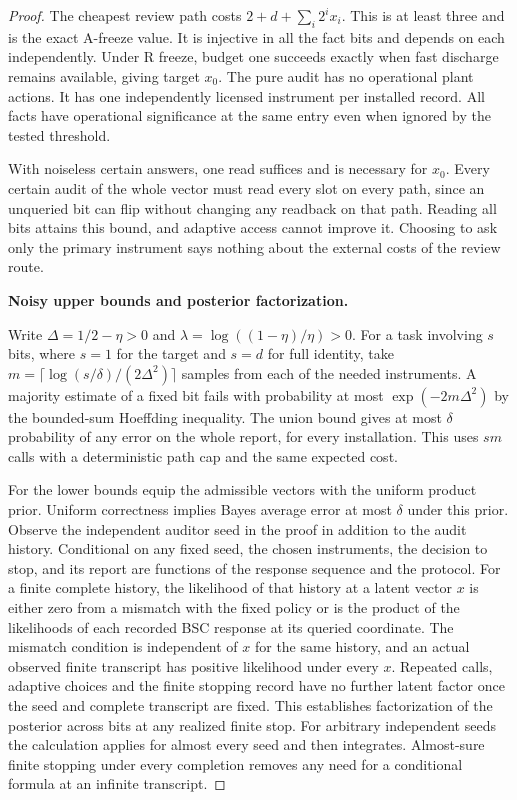 \begin{proof}
The cheapest review path costs \(2+d+\sum_i2^i x_i\). This is at least three and is the exact A-freeze value. It is injective in all the fact bits and depends on each independently. Under R freeze, budget one succeeds exactly when fast discharge remains available, giving target \(x_0\). The pure audit has no operational plant actions. It has one independently licensed instrument per installed record. All facts have operational significance at the same entry even when ignored by the tested threshold.

With noiseless certain answers, one read suffices and is necessary for \(x_0\). Every certain audit of the whole vector must read every slot on every path, since an unqueried bit can flip without changing any readback on that path. Reading all bits attains this bound, and adaptive access cannot improve it. Choosing to ask only the primary instrument says nothing about the external costs of the review route.

\textbf{Noisy upper bounds and posterior factorization.}

Write \(\Delta=1/2-\eta>0\) and \(\lambda=\log((1-\eta)/\eta)>0\). For a task involving \(s\) bits, where \(s=1\) for the target and \(s=d\) for full identity, take \(m=\lceil\log(s/\delta)/(2\Delta^2)\rceil\) samples from each of the needed instruments. A majority estimate of a fixed bit fails with probability at most \(\exp(-2m\Delta^2)\) by the bounded-sum Hoeffding inequality. The union bound gives at most \(\delta\) probability of any error on the whole report, for every installation. This uses \(sm\) calls with a deterministic path cap and the same expected cost.

For the lower bounds equip the admissible vectors with the uniform product prior. Uniform correctness implies Bayes average error at most \(\delta\) under this prior. Observe the independent auditor seed in the proof in addition to the audit history. Conditional on any fixed seed, the chosen instruments, the decision to stop, and its report are functions of the response sequence and the protocol. For a finite complete history, the likelihood of that history at a latent vector \(x\) is either zero from a mismatch with the fixed policy or is the product of the likelihoods of each recorded BSC response at its queried coordinate. The mismatch condition is independent of \(x\) for the same history, and an actual observed finite transcript has positive likelihood under every \(x\). Repeated calls, adaptive choices and the finite stopping record have no further latent factor once the seed and complete transcript are fixed. This establishes factorization of the posterior across bits at any realized finite stop. For arbitrary independent seeds the calculation applies for almost every seed and then integrates. Almost-sure finite stopping under every completion removes any need for a conditional formula at an infinite transcript.


\end{proof}
